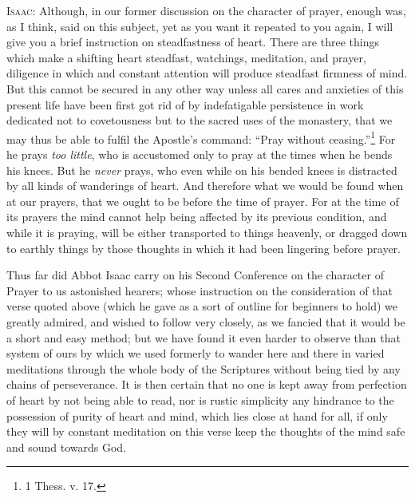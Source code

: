 \textsc{Isaac}: Although, in our former discussion on the character of prayer, enough was, as I think, said on this subject, yet as you want it repeated to you again, I will give you a brief instruction on steadfastness of heart. There are three things which make a shifting heart steadfast, watchings, meditation, and prayer, diligence in which and constant attention will produce steadfast firmness of mind. But this cannot be secured in any other way unless all cares and anxieties of this present life have been first got rid of by indefatigable persistence in work dedicated not to covetousness but to the sacred uses of the monastery, that we may thus be able to fulfil the Apostle’s command: “Pray without ceasing.”\footnote{1 Thess. v. 17.} For he prays \emph{too little}, who is accustomed only to pray at the times when he bends his knees. But he \emph{never} prays, who even while on his bended knees is distracted by all kinds of wanderings of heart. And therefore what we would be found when at our prayers, that we ought to be before the time of prayer. For at the time of its prayers the mind cannot help being affected by its previous condition, and while it is praying, will be either transported to things heavenly, or dragged down to earthly things by those thoughts in which it had been lingering before prayer.

Thus far did Abbot Isaac carry on his Second Conference on the character of Prayer to us astonished hearers; whose instruction on the consideration of that verse quoted above (which he gave as a sort of outline for beginners to hold) we greatly admired, and wished to follow very closely, as we fancied that it would be a short and easy method; but we have found it even harder to observe than that system of ours by which we used formerly to wander here and there in varied meditations through the whole body of the Scriptures without being tied by any chains of perseverance. It is then certain that no one is kept away from perfection of heart by not being able to read, nor is rustic simplicity any hindrance to the possession of purity of heart and mind, which lies close at hand for all, if only they will by constant meditation on this verse keep the thoughts of the mind safe and sound towards God.
